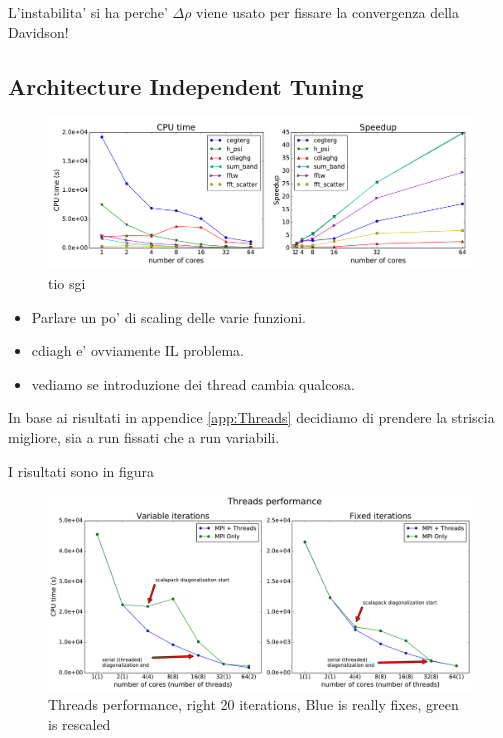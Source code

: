 \documentclass[a4paper,12pt]{article}
\begin{document}
L'instabilita' si ha perche' $\Delta \rho$ viene usato per fissare la convergenza della Davidson!


\newpage
\subsection{Architecture Independent Tuning}\label{sec:resArchIndependent}





\begin{figure}[hhh!]
\centerline{ \includegraphics[width=1.3\linewidth]{relevant_subroutines.pdf}	}
	\caption{tio sgi}
	\label{fig:relevantSubroutines}
\end{figure}


\begin{itemize}
	\item Parlare un po' di scaling delle varie funzioni.
	\item cdiagh e' ovviamente IL problema.
	\item vediamo se introduzione dei thread cambia qualcosa.
\end{itemize}

\newpage


In base ai risultati in appendice \ref{app:Threads} decidiamo di prendere la striscia migliore, sia a run fissati che a run variabili.

I risultati sono in figura 

\begin{figure}[hhh!]
\centerline{ \includegraphics[width=1.3\linewidth]{threads_overall.pdf}	}
	\caption{Threads performance, right 20 iterations, Blue is really fixes, green is rescaled}
	\label{fig:threadsOverall}

\end{figure}
\end{document}
